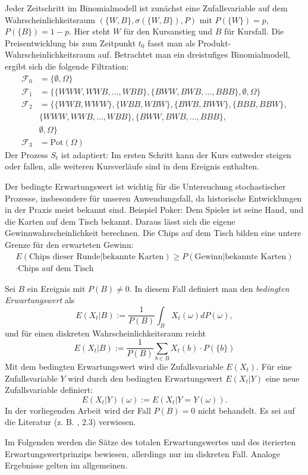 \begin{bsp}
Jeder Zeitschritt im Binomialmodell ist zunächst eine Zufallsvariable auf dem 
Wahrscheinlichkeitsraum $(\{W, B\}, \sigma(\{W, B\}), P)$ mit 
$P(\{W \}) = p$, $P(\{B \}) = 1-p$. Hier steht $W$ für den Kursanstieg und $B$ für Kursfall. Die Preisentwicklung bis zum Zeitpunkt $t_0$ fasst man als Produkt-Wahrscheinlichkeitsraum auf.
Betrachtet man ein dreistufiges Binomialmodell, ergibt sich die folgende Filtration: 
$$
\begin{aligned}
\mathcal F_0 &= \{\emptyset, \Omega\} \\
\mathcal F_1 &= \{\{WWW, WWB, \dots, WBB \}, \{ BWW, BWB, \dots, BBB \},\emptyset, \Omega \} \\ 
\mathcal F_2 &= \{ \{WWB, WWW \}, \{WBB, WBW \}, \{BWB, BWW \}, \{BBB, BBW \}, \\ &\{WWW, WWB, \dots, WBB \}, \{ BWW, BWB, \dots, BBB \}, \\ &\emptyset, \Omega \} \\
\mathcal F_3 &= \text{Pot}(\Omega)
\end{aligned}
$$
Der Prozess $S_t$ ist adaptiert: Im ersten Schritt kann der Kurs entweder steigen oder
fallen, alle weiteren Kursverläufe sind in dem Ereignis enthalten.

\end{bsp}

\begin{defi}

Der bedingte Erwartungswert ist wichtig für die Untersuchung stochastischer Prozesse,
insbesondere für unseren Anwendungsfall, da historische Entwicklungen in der Praxis 
meist bekannt sind. Beispiel Poker: Dem Spieler ist seine Hand, und die Karten auf dem 
Tisch bekannt. Daraus lässt sich die eigene Gewinnwahrscheinlichkeit berechnen. Die Chips auf
dem Tisch bilden eine untere Grenze für den erwarteten Gewinn:
$$
\begin{aligned}
E(\text{Chips dieser Runde}|\text{bekannte Karten}) \ge P(\text{Gewinn}|\text{bekannte Karten}) 
\\ \cdot \text{Chips auf dem Tisch}
\end{aligned}
$$

Sei $B$ ein Ereignis mit $P(B) \neq 0$. In diesem Fall definiert man
den \textit{bedingten Erwartungswert} als $$E(X_t|B):=  \frac{1}{P(B)} \int_{B}^{} X_t(\omega) dP(\omega),$$
und für einen diskreten Wahrscheinlichkeitsraum reicht
$$E(X_t|B):= \frac{1}{P(B)}\sum_{b \in B} X_t(b) \cdot P(\{ b \})$$
Mit dem bedingten Erwartungswert wird die Zufallsvariable $E(X_t)$.
Für eine Zufallsvariable $Y$ wird durch den bedingten Erwartungswert $E(X_t|Y)$ eine neue Zufallsvariable definiert:
$$E(X_t|Y)(\omega) := E(X_t|Y=Y(\omega)).$$
In der vorliegenden Arbeit wird der Fall $P(B) = 0$ nicht behandelt. Es sei auf die Literatur (z. B. \cite{shreve}, 2.3) verwiesen.

Im Folgenden werden die Sätze des totalen Erwartungswertes und des iterierten Erwartungswertprinzips bewiesen,
allerdings nur im diskreten Fall. Analoge Ergebnisse gelten im allgemeinen.

\end{defi}

